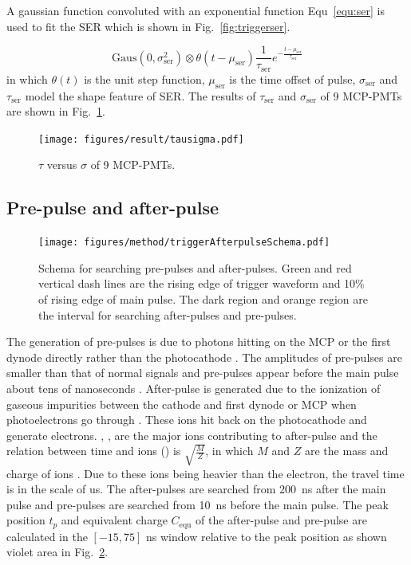 A gaussian function convoluted with an exponential function Equ~\eqref{equ:ser} is used to fit the SER which is shown in Fig.~\ref{fig:triggerser}.

\begin{equation}
    \label{equ:ser}
    \mathrm{Gaus}(0,\sigma_{\mathrm{ser}}^2)\otimes\theta(t-\mu_{\mathrm{ser}})\frac{1}{\tau_{\mathrm{ser}}}e^{-\frac{t-\mu_{\mathrm{ser}}}{\tau_{\mathrm{ser}}}}
\end{equation}
in which $\theta(t)$ is the unit step function, $\mu_{\mathrm{ser}}$ is the time offset of pulse, $\sigma_{\mathrm{ser}}$ and $\tau_{\mathrm{ser}}$ model the shape feature of SER. The results of $\tau_{\mathrm{ser}}$ and $\sigma_{\mathrm{ser}}$ of 9 MCP-PMTs are shown in Fig.~\ref{fig:sigmaCompare}.
\begin{figure}[!htbp]
    \centering
    \texttt{[image: figures/result/tausigma.pdf]}
    \caption{$\tau$ versus $\sigma$ of 9 MCP-PMTs.}
    \label{fig:sigmaCompare}
\end{figure}


\subsection{Pre-pulse and after-pulse}

\begin{figure}
    \centering
    \texttt{[image: figures/method/triggerAfterpulseSchema.pdf]}
    \caption{Schema for searching pre-pulses and after-pulses. Green and red vertical dash lines are the rising edge of trigger waveform and 10\% of rising edge of main pulse. The dark region and orange region are the interval for searching after-pulses and pre-pulses.}
    \label{fig:afterpulseSchema}
\end{figure}

The generation of pre-pulses is due to photons hitting on the MCP or the first dynode directly rather than the photocathode \cite{JUNOMassTesting}. The amplitudes of pre-pulses are smaller than that of normal signals and pre-pulses appear before the main pulse about tens of nanoseconds \cite{JUNOMassTesting}. After-pulse is generated due to the ionization of gaseous impurities between the cathode and first dynode or MCP when photoelectrons go through \cite{Coates_1973}. These ions hit back on the photocathode and generate electrons. , ,  are the major ions contributing to after-pulse and the relation between time and ions () is $\sqrt{\frac{M}{Z}}$, in which $M$ and $Z$ are the mass and charge of ions \cite{Coates_1973,XENON1TTesting}. Due to these ions being heavier than the electron, the travel time is in the scale of \si{us}. The after-pulses are searched from \SI{200}{ns} after the main pulse and pre-pulses are searched from \SI{10}{ns} before the main pulse. The peak position $t_p$ and equivalent charge $C_{\mathrm{equ}}$ of the after-pulse and pre-pulse are calculated in the $[-15,75]$ ns window relative to the peak position as shown violet area in Fig.~\ref{fig:afterpulseSchema}.

